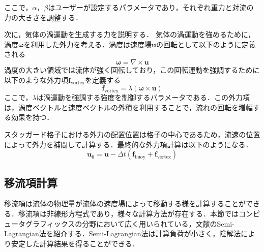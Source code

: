 \documentclass[a4j,12pt]{jreport}
\begin{document}
ここで，$\alpha$，$\beta$はユーザーが設定するパラメータであり，それぞれ重力と対流の力の大きさを調整する．

次に，気体の渦運動を生成する力を説明する．
気体の渦運動を強めるために，渦度$\boldsymbol{\omega}$を利用した外力を考える．渦度は速度場$\bm{u}$の回転として以下のように定義される
\[
    \boldsymbol{\omega} = \nabla \times \bm{u}
\]
渦度の大きい領域では流体が強く回転しており，この回転運動を強調するために以下のような外力項$\bm{f}_{\text{vortex}}$を定義する
\[
    \bm{f}_{\text{vortex}} = \lambda (\boldsymbol{\omega} \times \bm{u})
\]
ここで，$\lambda$は渦運動を強調する強度を制御するパラメータである．この外力項は，渦度ベクトルと速度ベクトルの外積を利用することで，流れの回転を増幅する効果を持つ．

スタッガード格子における外力の配置位置は格子の中心であるため，流速の位置によって外力を補間して計算する．最終的な外力項計算は以下のようになる．
\begin{equation}
	\bm{u_0} =  \bm{u}  - \varDelta t(\bm{f}_{\text{buoy}} +  \bm{f}_{\text{vortex}} ) 
\end{equation} 


\subsection{移流項計算}
移流項は流体の物理量が流体の速度場によって移動する様を計算することができる．移流項は非線形方程式であり，様々な計算方法が存在する．本節ではコンピュータグラフィックスの分野において広く用いられている，文献\cite{stam}のSemi-Lagrangian法を紹介する．Semi-Lagrangian法は計算負荷が小さく，陰解法により安定した計算結果を得ることができる．
\end{document}

